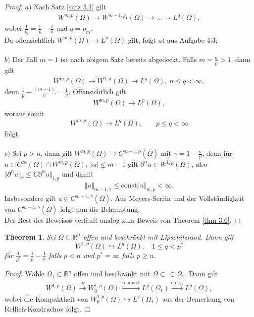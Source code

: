 \documentclass[
paper=a4,
bibtotocnumbered,
liststotocnumbered,
tablecaptionabove,
pointlessnumbers,
twoside,
openright,
10pt
]
{report}
\newtheorem{thm}{Theorem}[chapter]
\theoremstyle{definition}
\numberwithin{equation}{chapter}
\begin{document}
\begin{proof}
$a)$ Nach Satz \ref{satz 5.1} gilt
\begin{align*}
W^{m,p}(\Omega) \rightarrow W^{m-1,p_1} (\Omega) \rightarrow \ldots \rightarrow L^q(\Omega),
\end{align*}
wobei $\frac{1}{p_l}= \frac{1}{p} - \frac{l}{n}$ und $q = p_m$.
\\ Da offensichtlich $W^{m,p}(\Omega) \rightarrow L^p(\Omega)$ gilt, folgt $a)$ aus Aufgabe 4.3.
\\
\\$b)$ Der Fall $m=1$ ist nach obigem Satz bereits abgedeckt. Falls $m= \frac{n}{p}>1$, dann gilt
\begin{align*}
W^{m,p}(\Omega) \rightarrow W^{1,n}(\Omega) \rightarrow L^q(\Omega), \ n \leq q < \infty,
\end{align*}
denn $\frac{1}{p} - \frac{(m-1)}{n} = \frac{1}{n}.$ Offensichtlich gilt
\begin{align*}
W^{m,p}(\Omega) \rightarrow L^p (\Omega),
\end{align*}
woraus somit
\begin{align*}
W^{m,p}(\Omega) \rightarrow L^q (\Omega), \qquad p \leq q < \infty
\end{align*}
folgt.
\\
\\$c)$ Sei $p>n$, dann gilt $W^{m,p}(\Omega) \rightarrow C^{m-1,p}(\overline{\Omega})$ mit $\gamma = 1 - \frac{n}{p}$, denn für $u \in C^{\infty}(\Omega) \cap W^{m,p}(\Omega), \ |\alpha| \leq m-1$ gilt $\partial^{\alpha}u \in W^{1,p}(\Omega)$, also $\Vert \partial^{\alpha}u \Vert_{\gamma} \leq C \partial^{\alpha}u \Vert_{1,p}$ und damit
\begin{align*}
\Vert u \Vert_{m-1, \gamma} \leq \text{const} \Vert u \Vert_{m,p} < \infty.
\end{align*}
Insbesondere gilt $u \in C^{m-1, \gamma}(\overline{\Omega})$. Aus Meyers-Serrin und der Vollständigkeit von $C^{m-1,\gamma}(\overline{\Omega})$ folgt nun die Behauptung.
\\ Der Rest des Beweises verläuft analog zum Beweis von Theorem \ref{thm 3.6}.
\end{proof}
\begin{thm}
Sei $\Omega \subset \mathbb R^n$ offen und beschränkt mit Lipschitzrand. Dann gilt
\begin{equation}
W^{1,p}(\Omega) \hookrightarrow L^q(\Omega), \quad 1\le q < p^*
\end{equation}
für $\frac{1}{p^*}= \frac{1}{p} - \frac{1}{n}$ falls $p<n$ und $p^*=\infty$ falls $p \ge n$.
\end{thm}
\begin{proof}
Wähle $\Omega_1 \subset \mathbb{R}^n$ offen und beschränkt mit $\Omega \subset \subset \Omega_1.$ Dann gilt
\begin{align*}
W^{1,p}(\Omega) \overset{E}{\rightarrow} W_0^{1,p}(\Omega) \overset{\text{kompakt}}{\hookrightarrow} L^q(\Omega_1) \overset{\text{stetig}}{\rightarrow} L^q(\Omega),
\end{align*}
wobei die Kompaktheit von $W_0^{1,p}(\Omega) \hookrightarrow L^q(\Omega_1)$ aus der Bemerkung von Rellich-Kondrachov folgt.
\end{proof}
\end{document}
